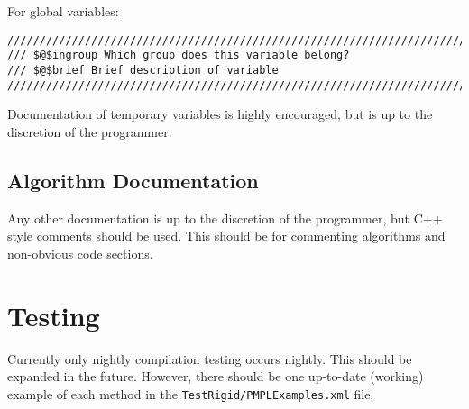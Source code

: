 \documentclass[12pt]{article}
\begin{document}
For global variables:
\begin{lstlisting}[mathescape]
///////////////////////////////////////////////////////////////////////////////
/// $@$ingroup Which group does this variable belong?
/// $@$brief Brief description of variable
///////////////////////////////////////////////////////////////////////////////
\end{lstlisting}

Documentation of temporary variables is highly encouraged, but is up to the
discretion of the programmer.

\subsection{Algorithm Documentation}

Any other documentation is up to the discretion of the programmer, but C++ style
comments should be used. This should be for commenting algorithms and
non-obvious code sections.


\section{Testing}
Currently only nightly compilation testing occurs nightly. This should be
expanded in the future. However, there should be one up-to-date (working)
example of each method in the \texttt{TestRigid/PMPLExamples.xml} file.
\end{document}
